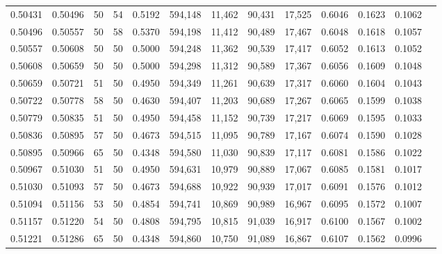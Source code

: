 \begin{tabular}{rrrrrrrrrrrrr}
0.50431 & 0.50496 &    50 &  54 &                                     0.5192 & 594,148 &  11,462 &  90,431 &  17,525 & 0.6046 & 0.1623 & 0.1062 \\
0.50496 & 0.50557 &    50 &  58 &                                     0.5370 & 594,198 &  11,412 &  90,489 &  17,467 & 0.6048 & 0.1618 & 0.1057 \\
0.50557 & 0.50608 &    50 &  50 &                                     0.5000 & 594,248 &  11,362 &  90,539 &  17,417 & 0.6052 & 0.1613 & 0.1052 \\
0.50608 & 0.50659 &    50 &  50 &                                     0.5000 & 594,298 &  11,312 &  90,589 &  17,367 & 0.6056 & 0.1609 & 0.1048 \\
0.50659 & 0.50721 &    51 &  50 &                                     0.4950 & 594,349 &  11,261 &  90,639 &  17,317 & 0.6060 & 0.1604 & 0.1043 \\
0.50722 & 0.50778 &    58 &  50 &                                     0.4630 & 594,407 &  11,203 &  90,689 &  17,267 & 0.6065 & 0.1599 & 0.1038 \\
0.50779 & 0.50835 &    51 &  50 &                                     0.4950 & 594,458 &  11,152 &  90,739 &  17,217 & 0.6069 & 0.1595 & 0.1033 \\
0.50836 & 0.50895 &    57 &  50 &                                     0.4673 & 594,515 &  11,095 &  90,789 &  17,167 & 0.6074 & 0.1590 & 0.1028 \\
0.50895 & 0.50966 &    65 &  50 &                                     0.4348 & 594,580 &  11,030 &  90,839 &  17,117 & 0.6081 & 0.1586 & 0.1022 \\
0.50967 & 0.51030 &    51 &  50 &                                     0.4950 & 594,631 &  10,979 &  90,889 &  17,067 & 0.6085 & 0.1581 & 0.1017 \\
0.51030 & 0.51093 &    57 &  50 &                                     0.4673 & 594,688 &  10,922 &  90,939 &  17,017 & 0.6091 & 0.1576 & 0.1012 \\
0.51094 & 0.51156 &    53 &  50 &                                     0.4854 & 594,741 &  10,869 &  90,989 &  16,967 & 0.6095 & 0.1572 & 0.1007 \\
0.51157 & 0.51220 &    54 &  50 &                                     0.4808 & 594,795 &  10,815 &  91,039 &  16,917 & 0.6100 & 0.1567 & 0.1002 \\
0.51221 & 0.51286 &    65 &  50 &                                     0.4348 & 594,860 &  10,750 &  91,089 &  16,867 & 0.6107 & 0.1562 & 0.0996 \\

\end{tabular}
